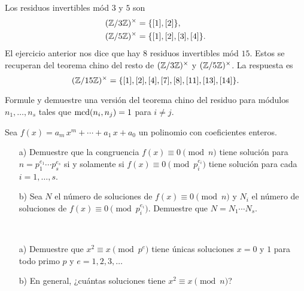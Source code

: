 \documentclass{article}
\begin{document}
\begin{ejemplo}
  Los residuos invertibles mód $3$ y $5$ son
  \begin{align*}
    (\mathbb{Z}/3\mathbb{Z})^\times & = \{ [1], [2] \}, \\
    (\mathbb{Z}/5\mathbb{Z})^\times & = \{ [1], [2], [3], [4] \}.
  \end{align*}
  El ejercicio anterior nos dice que hay $8$ residuos invertibles mód
  $15$. Estos se recuperan del teorema chino del resto de
  $(\mathbb{Z}/3\mathbb{Z})^\times$ y $(\mathbb{Z}/5\mathbb{Z})^\times$. La respuesta es
  $$(\mathbb{Z}/15\mathbb{Z})^\times = \{ [1], [2], [4], [7], [8], [11], [13], [14] \}.$$
\end{ejemplo}

\begin{problema}
  Formule y demuestre una versión del teorema chino del residuo para módulos
  $n_1, \ldots, n_s$ tales que $\operatorname{mcd} (n_i,n_j) = 1$ para $i \ne j$.
\end{problema}

\begin{problema}
  Sea $f (x) = a_m\,x^m + \cdots + a_1\,x + a_0$ un polinomio con coeficientes
  enteros.

  \begin{enumerate}
  \item[a)] Demuestre que la congruencia $f (x) \equiv 0 \pmod{n}$ tiene
    solución para $n = p_1^{e_1} \cdots p_s^{e_s}$ si y solamente si
    $f (x) \equiv 0 \pmod{p_i^{e_i}}$ tiene solución para cada $i = 1,\ldots,s$.

  \item[b)] Sea $N$ el número de soluciones de $f (x) \equiv 0 \pmod{n}$ y $N_i$
    el número de soluciones de $f (x) \equiv 0 \pmod{p_i^{e_i}}$. Demuestre que
    $N = N_1 \cdots N_s$.
  \end{enumerate}
\end{problema}

\begin{problema}
  ~

  \begin{enumerate}
  \item[a)] Demuestre que $x^2 \equiv x \pmod{p^e}$ tiene únicas soluciones
    $x = 0$ y $1$ para todo primo $p$ y $e = 1,2,3,\ldots$

  \item[b)] En general, ¿cuántas soluciones tiene $x^2 \equiv x \pmod{n}$?
  \end{enumerate}
\end{problema}
\end{document}
